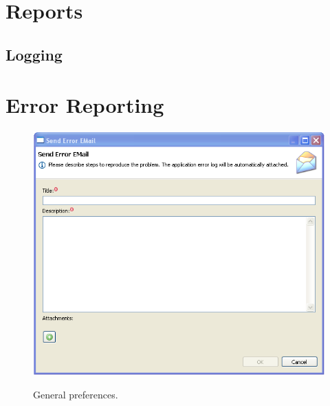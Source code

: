 \chapter{Reports}
\label{chap:reports}
\section{Logging}

\chapter{Error Reporting}
\label{chap:error_reporting}

\begin{figure}[H]
  \centering
  \scalebox{0.5}
	   { \includegraphics*{screenshots/error_reporting/send_error_email} }
	   \caption{General preferences.}
	   \label{fig:prefs_general}
\end{figure}
